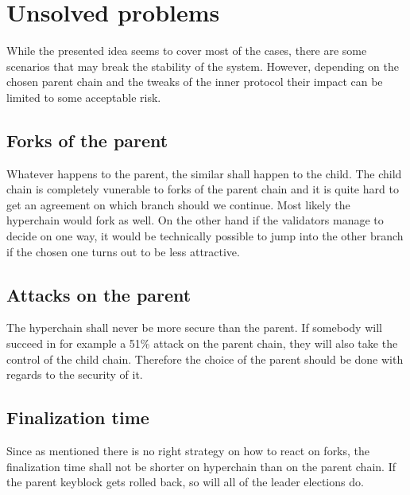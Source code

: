 \section{Unsolved problems}

While the presented idea seems to cover most of the cases, there are some
scenarios that may break the stability of the system. However, depending on the
chosen parent chain and the tweaks of the inner protocol their impact can be
limited to some acceptable risk.

\subsection{Forks of the parent}
Whatever happens to the parent, the similar shall happen to the child. The child
chain is completely vunerable to forks of the parent chain and it is quite hard
to get an agreement on which branch should we continue. Most likely the
hyperchain would fork as well. On the other hand if the validators manage to
decide on one way, it would be technically possible to jump into the other
branch if the chosen one turns out to be less attractive.

\subsection{Attacks on the parent}

The hyperchain shall never be more secure than the parent. If somebody will
succeed in for example a 51\% attack on the parent chain, they will also take
the control of the child chain. Therefore the choice of the parent should be
done with regards to the security of it.

\subsection{Finalization time}

Since as mentioned there is no right strategy on how to react on forks, the
finalization time shall not be shorter on hyperchain than on the parent chain.
If the parent keyblock gets rolled back, so will all of the leader elections do.